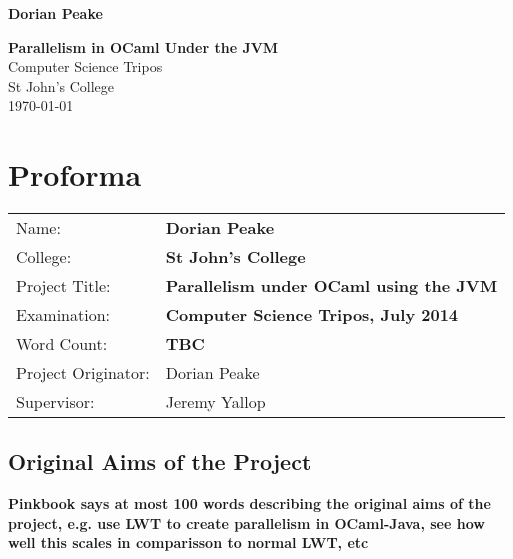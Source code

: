 \documentclass[12pt,twoside,notitlepage]{report}
\begin{document}





\pagestyle{empty}

\hfill{\LARGE \bf Dorian Peake}

\vspace*{60mm}
\begin{center}
\Huge
{\bf Parallelism in OCaml Under the JVM} \\
\vspace*{5mm}
Computer Science Tripos \\
\vspace*{5mm}
St John's College \\
\vspace*{5mm}
\today  %
\end{center}

\cleardoublepage


\setcounter{page}{1}
\pagestyle{plain}

\chapter*{Proforma}

{\large
\begin{tabular}{ll}
Name:               & \bf Dorian Peake  \\
College:            & \bf St John's College                     \\
Project Title:      & \bf Parallelism under OCaml using the JVM  \\
Examination:        & \bf Computer Science Tripos, July 2014        \\
Word Count:         & \bf TBC  \\
Project Originator: & Dorian Peake                    \\
Supervisor:         & Jeremy Yallop                   \\ 
\end{tabular}
}


\section*{Original Aims of the Project}

{\bf Pinkbook says at most 100 words describing the original aims of the project, e.g. use LWT to create parallelism in OCaml-Java, see how well this scales in comparisson to normal LWT, etc }
\end{document}
